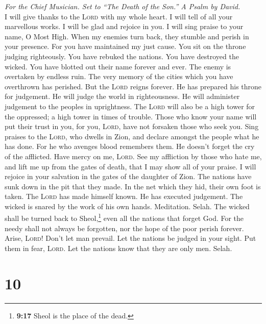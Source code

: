 \emph{For the Chief Musician. Set to ``The Death of the Son.'' A Psalm
by David.}\\
 I will give thanks to the \textsc{Lord} with my whole
heart. I will tell of all your marvellous works.  I will
be glad and rejoice in you. I will sing praise to your name, O Most
High.  When my enemies turn back, they stumble and perish
in your presence.  For you have maintained my just cause.
You sit on the throne judging righteously.  You have
rebuked the nations. You have destroyed the wicked. You have blotted out
their name forever and ever.  The enemy is overtaken by
endless ruin. The very memory of the cities which you have overthrown
has perished.  But the \textsc{Lord} reigns forever. He
has prepared his throne for judgement.  He will judge the
world in righteousness. He will administer judgement to the peoples in
uprightness.  The \textsc{Lord} will also be a high tower
for the oppressed; a high tower in times of trouble. 
Those who know your name will put their trust in you, for you,
\textsc{Lord}, have not forsaken those who seek you. 
Sing praises to the \textsc{Lord}, who dwells in Zion, and declare
amongst the people what he has done.  For he who avenges
blood remembers them. He doesn't forget the cry of the afflicted.
 Have mercy on me, \textsc{Lord}. See my affliction by
those who hate me, and lift me up from the gates of death,
 that I may show all of your praise. I will rejoice in
your salvation in the gates of the daughter of Zion.  The
nations have sunk down in the pit that they made. In the net which they
hid, their own foot is taken.  The \textsc{Lord} has made
himself known. He has executed judgement. The wicked is snared by the
work of his own hands. Meditation. Selah.  The wicked
shall be turned back to Sheol,\footnote{\textbf{9:17} Sheol is the place
  of the dead.} even all the nations that forget God. 
For the needy shall not always be forgotten, nor the hope of the poor
perish forever.  Arise, \textsc{Lord}! Don't let man
prevail. Let the nations be judged in your sight.  Put
them in fear, \textsc{Lord}. Let the nations know that they are only
men. Selah.

\hypertarget{section-9}{%
\section{10}\label{section-9}}

